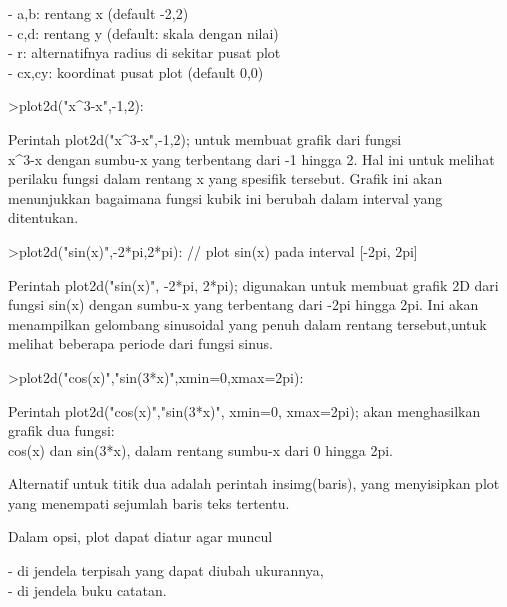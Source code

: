 \documentclass{article}
\begin{document}
\begin{eulernotebook}
\begin{eulercomment}
\begin{eulercomment}
\begin{eulercomment}
\begin{eulercomment}
\begin{eulercomment}
- a,b: rentang x (default -2,2)\\
- c,d: rentang y (default: skala dengan nilai)\\
- r: alternatifnya radius di sekitar pusat plot\\
- cx,cy: koordinat pusat plot (default 0,0)
\end{eulercomment}
\begin{eulerprompt}
>plot2d("x^3-x",-1,2):
\end{eulerprompt}
\begin{eulercomment}
Perintah plot2d("x\textasciicircum{}3-x",-1,2); untuk membuat grafik dari fungsi\\
x\textasciicircum{}3-x dengan sumbu-x yang terbentang dari -1 hingga 2. Hal ini untuk
melihat perilaku fungsi dalam rentang x yang spesifik tersebut. Grafik
ini akan menunjukkan bagaimana fungsi kubik ini berubah dalam interval
yang ditentukan.

\end{eulercomment}
\begin{eulerprompt}
>plot2d("sin(x)",-2*pi,2*pi): // plot sin(x) pada interval [-2pi, 2pi]
\end{eulerprompt}
\begin{eulercomment}
Perintah plot2d("sin(x)", -2*pi, 2*pi); digunakan untuk membuat grafik
2D dari fungsi sin(x) dengan sumbu-x yang terbentang dari -2pi hingga
2pi. Ini akan menampilkan gelombang sinusoidal yang penuh dalam
rentang tersebut,untuk melihat beberapa periode dari fungsi sinus.
\end{eulercomment}
\begin{eulerprompt}
>plot2d("cos(x)","sin(3*x)",xmin=0,xmax=2pi):
\end{eulerprompt}
\begin{eulercomment}
Perintah plot2d("cos(x)","sin(3*x)", xmin=0, xmax=2pi); akan
menghasilkan grafik dua fungsi:\\
cos(x) dan sin(3*x), dalam rentang sumbu-x dari 0 hingga 2pi.

Alternatif untuk titik dua adalah perintah insimg(baris), yang
menyisipkan plot yang menempati sejumlah baris teks tertentu.

Dalam opsi, plot dapat diatur agar muncul

- di jendela terpisah yang dapat diubah ukurannya,\\
- di jendela buku catatan.


\end{eulercomment}
\end{eulercomment}
\end{eulercomment}
\end{eulercomment}
\end{eulercomment}
\end{eulernotebook}
\end{document}
